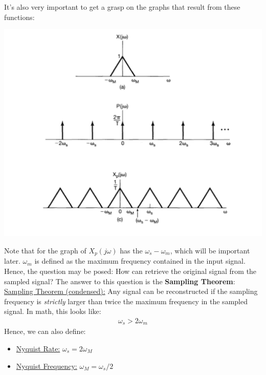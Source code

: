 \documentclass{article}
\newcommand{\sheader}[1]{\underline{#1:}}
\newcommand{\gap}{\medskip\\}
\begin{document}
It's also very important to get a grasp on the graphs that result from these functions:
\\
\begin{center}
    \includegraphics[scale=0.45]{sampling-graphs.png}    
\end{center}
Note that for the graph of $X_p(j\omega)$ has the $\omega_s - \omega_m$, which will
be important later. $\omega_m$ is defined as the maximum frequency contained in the
input signal.
\gap
Hence, the question may be posed: How can retrieve the original signal from the
sampled signal? The answer to this question is the \textbf{Sampling Theorem}:
\gap
\sheader{Sampling Theorem (condensed)}
Any signal can be reconstructed if the sampling frequency is \textit{strictly} larger than twice
the maximum frequency in the sampled signal. In math, this looks like:
\begin{align*}
    \omega_s > 2\omega_m
\end{align*} 
Hence, we can also define:
\begin{itemize}
    \item \sheader{Nyquist Rate} $\omega_s = 2\omega_M$
    \item \sheader{Nyquist Frequency} $\omega_M = \omega_s / 2$
\end{itemize}

\pagebreak
\end{document}
